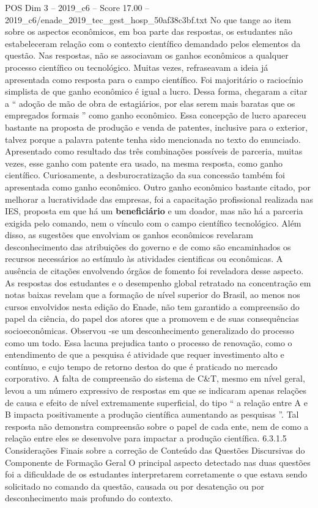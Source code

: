 \begin{textsample}{POS Dim 3 – 2019\_c6 – Score 17.00 – 2019\_c6/enade\_2019\_tec\_gest\_hosp\_50af38c3bf.txt}
No que tange ao item sobre os aspectos econômicos, em boa parte das respostas, os estudantes não estabeleceram relação com o contexto científico demandado pelos elementos da questão.
Nas respostas, não se associavam os ganhos econômicos a qualquer processo científico ou tecnológico.
Muitas vezes, refraseavam a ideia já apresentada como resposta para o campo científico.
Foi majoritário o raciocínio simplista de que ganho econômico é igual a lucro.
Dessa forma, chegaram a citar a “ adoção de mão de obra de estagiários, por elas serem mais baratas que os empregados formais ” como ganho econômico.
Essa concepção de lucro apareceu bastante na proposta de produção e venda de patentes, inclusive para o exterior, talvez porque a palavra patente tenha sido mencionada no texto do enunciado.
Apresentado como resultado das três combinações possíveis de parceria, muitas vezes, esse ganho com patente era usado, na mesma resposta, como ganho científico.
Curiosamente, a desburocratização da sua concessão também foi apresentada como ganho econômico.
Outro ganho econômico bastante citado, por melhorar a lucratividade das empresas, foi a capacitação profissional realizada nas IES, proposta em que há um \textbf{beneficiário} e um doador, mas não há a parceria exigida pelo comando, nem o vínculo com o campo científico tecnológico.
Além disso, as sugestões que envolviam os ganhos econômicos revelaram desconhecimento das atribuições do governo e de como são encaminhados os recursos necessários ao estímulo às atividades cientificas ou econômicas.
A ausência de citações envolvendo órgãos de fomento foi reveladora desse aspecto.
As respostas dos estudantes e o desempenho global retratado na concentração em notas baixas revelam que a formação de nível superior do Brasil, ao menos nos cursos envolvidos nesta edição do Enade, não tem garantido a compreensão do papel da ciência, do papel dos atores que a promovem e de suas consequências socioeconômicas.
Observou -se um desconhecimento generalizado do processo como um todo.
Essa lacuna prejudica tanto o processo de renovação, como o entendimento de que a pesquisa é atividade que requer investimento alto e contínuo, e cujo tempo de retorno destoa do que é praticado no mercado corporativo.
A falta de compreensão do sistema de C\&T, mesmo em nível geral, levou a um número expressivo de respostas em que se indicaram apenas relações de causa e efeito de nível extremamente superficial, do tipo “ a relação entre A e B impacta positivamente a produção científica aumentando as pesquisas ”.
Tal resposta não demonstra compreensão sobre o papel de cada ente, nem de como a relação entre eles se desenvolve para impactar a produção científica. 6.3.1.5 Considerações Finais sobre a correção de Conteúdo das Questões Discursivas do Componente de Formação Geral O principal aspecto detectado nas duas questões foi a dificuldade de os estudantes interpretarem corretamente o que estava sendo solicitado no comando da questão, causada ou por desatenção ou por desconhecimento mais profundo do contexto.

\end{textsample}

